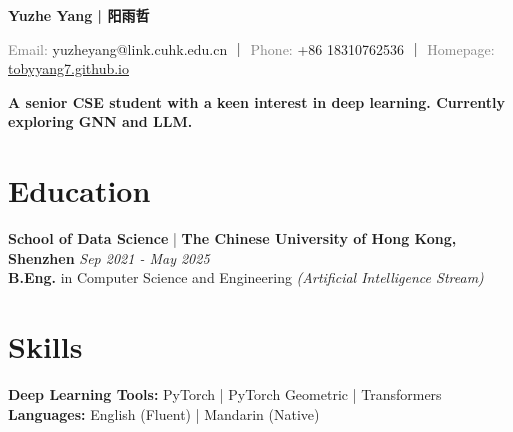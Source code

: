\documentclass[a4paper,8pt]{article}
\newcommand{\contact}[2]{\noindent\textcolor{gray}{#1:} #2}
\begin{document}
\newcommand{\name}[1]{\noindent\textbf{\LARGE #1}\vspace{0.5em}}

\begin{center}
\vspace{-0.2in}
\name{Yuzhe Yang | 阳雨哲}

\contact{Email}{yuzheyang@link.cuhk.edu.cn} ｜ \contact{Phone}{+86 18310762536} ｜ \contact{Homepage}{\href{https://tobyyang7.github.io/}{tobyyang7.github.io}}

\textbf{A senior CSE student with a keen interest in deep learning. Currently exploring GNN and LLM.\\}

\end{center}

\section*{Education}
\textbf{School of Data Science} | \textbf{The Chinese University of Hong Kong, Shenzhen} \hfill \textit{Sep 2021 - May 2025}\\
\textbf{B.Eng.} in Computer Science and Engineering \textit{\small (Artificial Intelligence Stream)}



\section*{Skills}
\textbf{Deep Learning Tools:} PyTorch | PyTorch Geometric | Transformers \hfill
\textbf{Languages:} English (Fluent) | Mandarin (Native)

\end{document}
